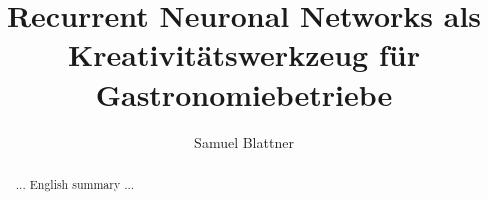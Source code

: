 \documentclass{ffhsthesis}
\begin{document}
    \title{Recurrent Neuronal Networks als Kreativitätswerkzeug für Gastronomiebetriebe}
    \author{Samuel Blattner}


    \maketitle

    \begin{zusammenfassung}

    \end{zusammenfassung}

    \begin{abstract}
        ... English summary ...
    \end{abstract}

    \tableofcontents

    \startThesis %

    
    
    
    

    
    
\end{document}
